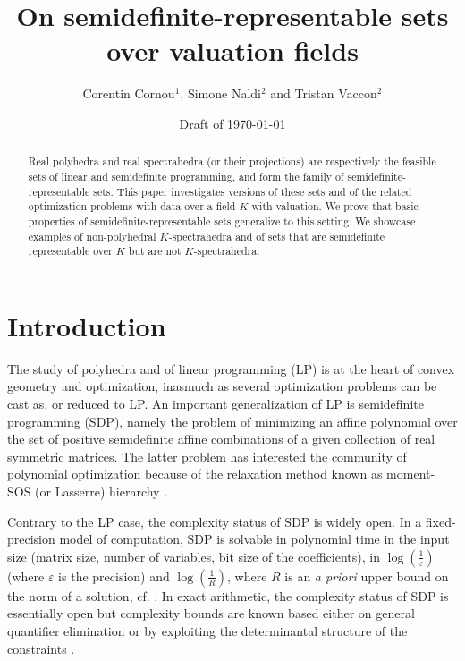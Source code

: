 \documentclass[a4paper,oneside,11pt]{article}
\title{\bf On semidefinite-representable sets over valuation fields}
\begin{document}
\author{Corentin Cornou$^{1}$, Simone Naldi$^{2}$ and Tristan Vaccon$^{2}$}


\date{Draft of \today}

\maketitle

\begin{abstract}
  \noindent
  Real polyhedra and real spectrahedra (or their projections) are respectively the feasible sets
  of linear and semidefinite programming, and form the family of
  semidefinite-representable sets. This paper investigates versions of these sets and of
  the related optimization problems with data over a field $K$ with valuation.
  We prove that basic properties of semidefinite-representable sets generalize to this setting.
  We showcase examples of non-polyhedral $K$-spectrahedra and of sets that are semidefinite
  representable over $K$ but are not $K$-spectrahedra.
\end{abstract}


\section{Introduction}

The study of polyhedra and of linear programming (LP) is at the heart of convex geometry and optimization,
inasmuch as several optimization problems can be cast as, or reduced to LP. An important generalization of LP
is semidefinite programming (SDP), namely the problem of minimizing an affine polynomial over the set of
positive semidefinite affine combinations of a given collection of real symmetric matrices. The latter problem 
has interested the community of polynomial optimization because of the relaxation method known as moment-SOS
(or Lasserre) hierarchy \cite{henrion2020moment}.

Contrary to the LP case, the complexity status of SDP is widely open.
In a fixed-precision model of computation, SDP is solvable in polynomial time in the input size (matrix size,
number of variables, bit size of the coefficients), in $\log(\frac{1}{\varepsilon})$ (where $\varepsilon$ is the
precision) and $\log(\frac{1}{R})$, where $R$ is an {\it a priori} upper bound on the norm of a solution,
cf. \cite[Sec.1.9]{deKlerk}. In exact arithmetic, the complexity status of SDP is essentially open but complexity
bounds are known based either on general quantifier elimination \cite{ramana1997exact,porkolab1997complexity}
or by exploiting the determinantal structure of the constraints \cite{henrion2016exact}.
\end{document}

